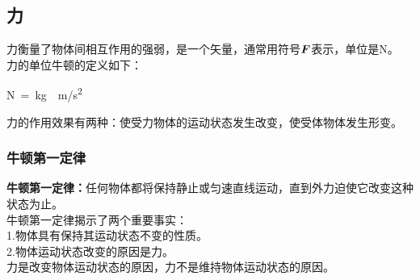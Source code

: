 \documentclass[UTF8]{ctexart}
\newcommand*{\veb}[1]{\vb*{#1}}
\begin{document}
\subsection{力}
    力衡量了物体间相互作用的强弱，是一个矢量，通常用符号$\veb{F}$表示，单位是\si{N}。\\[3mm]
    力的单位牛顿的定义如下：
    \begin{large}
        \begin{center}
            \si{N=kg\cdot m/s^2}\\[6mm]
        \end{center}
    \end{large}
    力的作用效果有两种：使受力物体的运动状态发生改变，使受体物体发生形变。\\

\subsubsection{牛顿第一定律}
    \textbf{牛顿第一定律：}任何物体都将保持静止或匀速直线运动，直到外力迫使它改变这种状态为止。\\[3mm]
    牛顿第一定律揭示了两个重要事实：\\[3mm]
    1.物体具有保持其运动状态不变的性质。\\[3mm]
    2.物体运动状态改变的原因是力。\\[3mm]
    力是改变物体运动状态的原因，力不是维持物体运动状态的原因。

\newpage
\end{document}
